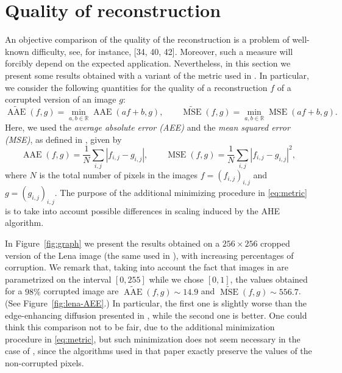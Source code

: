 \documentclass[proc]{edpsmath}
\begin{document}
{\color{magenta}
\section{Quality of reconstruction}\label{sec:comparison}

An objective comparison of the quality of the reconstruction is a problem of well-known difficulty, see, for instance, [34, 40, 42]. Moreover, such
a measure will forcibly depend on the expected application.
Nevertheless, in this section we present some results obtained with a variant of the metric used in \cite{GWWBBS}.
In particular, we consider the following quantities for the quality of a reconstruction $f$ of a corrupted version of an image $g$:
\begin{equation}\label{eq:metric}
  \widetilde{\operatorname{AAE}}(f,g) = \min_{a,b\in\mathbb R}\operatorname{AAE}(a f+b,g),\qquad
  \widetilde{\operatorname{MSE}}(f,g) = \min_{a,b\in\mathbb R}\operatorname{MSE}(a f+b,g).
\end{equation}
Here, we used the \emph{average absolute error (AEE)} and the \emph{mean squared error (MSE)}, as defined in \cite{GWWBBS}, given by
\begin{equation}
  \operatorname{AAE}(f,g) = \frac{1}{N}\sum_{i,j} |f_{i,j}-g_{i,j}|,\qquad
  \operatorname{MSE}(f,g) = \frac{1}{N}\sum_{i,j} |f_{i,j}-g_{i,j}|^2,
\end{equation}
where $N$ is the total number of pixels in the images $f=(f_{i,j})_{i,j}$ and $g=(g_{i,j})_{i,j}$. 
The purpose of the additional minimizing procedure in \eqref{eq:metric} is to take into account possible differences in scaling induced by the AHE algorithm. 

In Figure~\ref{fig:graph} we present the results obtained on a $256\times 256$ cropped version of the Lena image (the same used in \cite{GWWBBS}), with increasing percentages of corruption. 
We remark that, taking into account the fact that images in \cite{GWWBBS} are parametrized on the interval $[0,255]$ while we chose $[0,1]$, the values obtained for a $98\%$ corrupted image are $\widetilde{\operatorname{AAE}}(f,g)\sim14.9$ and $\widetilde{\operatorname{MSE}}(f,g)\sim556.7$. (See Figure~\ref{fig:lena-AEE}.) In particular, the first one is slightly worse than the edge-enhancing diffusion presented in \cite[Table~1]{GWWBBS}, while the second one is better.
One could think this comparison not to be fair, due to the additional minimization procedure in \eqref{eq:metric}, but such minimization does not seem necessary in the case of \cite{GWWBBS}, since the algorithms used in that paper exactly preserve the values of the non-corrupted pixels.

}
\end{document}
